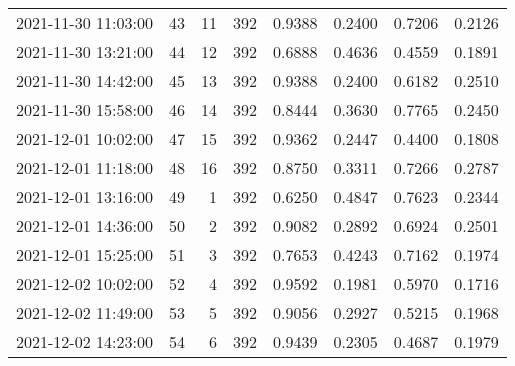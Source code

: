 \begin{longtable}{lrrrrrrr}
2021-11-30 11:03:00 &   43 &   11 &    392 &   0.9388 & 0.2400 & 0.7206 & 0.2126 \\
2021-11-30 13:21:00 &   44 &   12 &    392 &   0.6888 & 0.4636 & 0.4559 & 0.1891 \\
2021-11-30 14:42:00 &   45 &   13 &    392 &   0.9388 & 0.2400 & 0.6182 & 0.2510 \\
2021-11-30 15:58:00 &   46 &   14 &    392 &   0.8444 & 0.3630 & 0.7765 & 0.2450 \\
2021-12-01 10:02:00 &   47 &   15 &    392 &   0.9362 & 0.2447 & 0.4400 & 0.1808 \\
2021-12-01 11:18:00 &   48 &   16 &    392 &   0.8750 & 0.3311 & 0.7266 & 0.2787 \\
2021-12-01 13:16:00 &   49 &    1 &    392 &   0.6250 & 0.4847 & 0.7623 & 0.2344 \\
2021-12-01 14:36:00 &   50 &    2 &    392 &   0.9082 & 0.2892 & 0.6924 & 0.2501 \\
2021-12-01 15:25:00 &   51 &    3 &    392 &   0.7653 & 0.4243 & 0.7162 & 0.1974 \\
2021-12-02 10:02:00 &   52 &    4 &    392 &   0.9592 & 0.1981 & 0.5970 & 0.1716 \\
2021-12-02 11:49:00 &   53 &    5 &    392 &   0.9056 & 0.2927 & 0.5215 & 0.1968 \\
2021-12-02 14:23:00 &   54 &    6 &    392 &   0.9439 & 0.2305 & 0.4687 & 0.1979 \\
\end{longtable}
